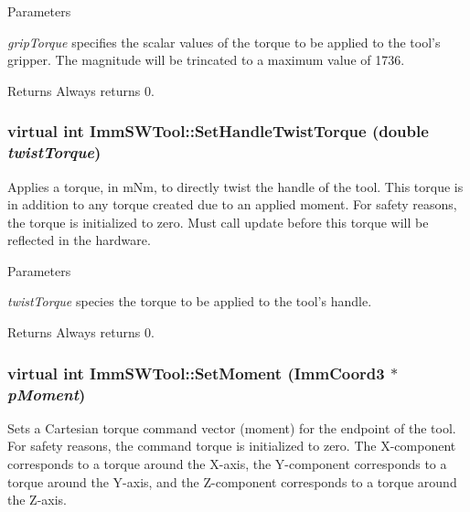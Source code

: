 \begin{DoxyParams}{Parameters}
\item[{\em gripTorque}]specifies the scalar values of the torque to be applied to the tool's gripper. The magnitude will be trincated to a maximum value of 1736.\end{DoxyParams}
\begin{DoxyReturn}{Returns}
Always returns 0. 
\end{DoxyReturn}
\hypertarget{classImmSWTool_a0cc829cca7970ef4d58e93f9e5553cd3}{
\subsubsection[{SetHandleTwistTorque}]{\setlength{\rightskip}{0pt plus 5cm}virtual int ImmSWTool::SetHandleTwistTorque (double {\em twistTorque})}}
\label{classImmSWTool_a0cc829cca7970ef4d58e93f9e5553cd3}
Applies a torque, in mNm, to directly twist the handle of the tool. This torque is in addition to any torque created due to an applied moment. For safety reasons, the torque is initialized to zero. Must call update before this torque will be reflected in the hardware.


\begin{DoxyParams}{Parameters}
\item[{\em twistTorque}]species the torque to be applied to the tool's handle.\end{DoxyParams}
\begin{DoxyReturn}{Returns}
Always returns 0. 
\end{DoxyReturn}
\hypertarget{classImmSWTool_a2a20a7a1eacb97d9bf48044ca944b73c}{
\subsubsection[{SetMoment}]{\setlength{\rightskip}{0pt plus 5cm}virtual int ImmSWTool::SetMoment ({\bf ImmCoord3} $\ast$ {\em pMoment})}}
\label{classImmSWTool_a2a20a7a1eacb97d9bf48044ca944b73c}
Sets a Cartesian torque command vector (moment) for the endpoint of the tool. For safety reasons, the command torque is initialized to zero. The X-\/component corresponds to a torque around the X-\/axis, the Y-\/component corresponds to a torque around the Y-\/axis, and the Z-\/component corresponds to a torque around the Z-\/axis.


